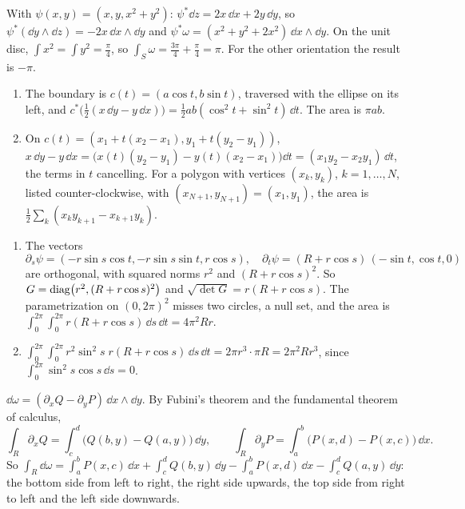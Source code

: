 With $\psi(x, y) = (x, y, x^2 + y^2)$: $\psi^*\dd z
= 2x\,\dd x + 2y\,\dd y$, so
$\psi^*(\dd y\wedge\dd z) = -2x\,\dd x\wedge\dd y$ and
$\psi^*\omega = (x^2 + y^2 + 2x^2)\,\dd x\wedge\dd y$. On the unit
disc, $\int x^2 = \int y^2 = \frac\pi4$, so
$\int_S\omega = \frac{3\pi}4 + \frac\pi4 = \pi$. For the other
orientation the result is $-\pi$.

\begin{enumerate}[nosep]
  \item The boundary is $c(t) = (a\cos t, b\sin t)$, traversed with the
        ellipse on its left, and
        $c^*\bigl(\frac12(x\,\dd y - y\,\dd x)\bigr)
        = \frac12ab(\cos^2t + \sin^2t)\,\dd t$. The area is $\pi ab$.
  \item On $c(t) = (x_1 + t(x_2 - x_1), y_1 + t(y_2 - y_1))$,
        $x\,\dd y - y\,\dd x
        = \bigl(x(t)(y_2 - y_1) - y(t)(x_2 - x_1)\bigr)\dd t
        = (x_1y_2 - x_2y_1)\,\dd t$, the terms in $t$ cancelling. For a
        polygon with vertices $(x_k, y_k)$, $k = 1,\dots,N$, listed
        counter-clockwise, with $(x_{N+1}, y_{N+1}) = (x_1, y_1)$, the
        area is $\frac12\sum_k(x_ky_{k+1} - x_{k+1}y_k)$.
\end{enumerate}

\begin{enumerate}[nosep]
  \item The vectors
        \[
          \partial_s\psi = (-r\sin s\cos t, -r\sin s\sin t, r\cos s) ,
          \quad
          \partial_t\psi = (R + r\cos s)\,(-\sin t, \cos t, 0)
        \]
        are orthogonal, with squared norms $r^2$ and
        $(R + r\cos s)^2$. So
        $G = \operatorname{diag}\bigl(r^2, (R + r\cos s)^2\bigr)$ and
        $\sqrt{\det G} = r(R + r\cos s)$. The parametrization on
        $(0, 2\pi)^2$ misses two circles, a null set, and the area is
        $\int_0^{2\pi}\!\int_0^{2\pi}r(R + r\cos s)\,\dd s\,\dd t
        = 4\pi^2Rr$.
  \item $\int_0^{2\pi}\!\int_0^{2\pi}r^2\sin^2s\;r(R + r\cos s)\,
        \dd s\,\dd t = 2\pi r^3\cdot\pi R = 2\pi^2Rr^3$, since
        $\int_0^{2\pi}\sin^2s\cos s\,\dd s = 0$.
\end{enumerate}

$\dd\omega = (\partial_xQ - \partial_yP)\,\dd x\wedge\dd y$. By
Fubini's theorem and the fundamental theorem of calculus,
\[
  \int_R\partial_xQ = \int_c^d\bigl(Q(b, y) - Q(a, y)\bigr)\,\dd y ,
  \qquad
  \int_R\partial_yP = \int_a^b\bigl(P(x, d) - P(x, c)\bigr)\,\dd x .
\]
So $\int_R\dd\omega = \int_a^bP(x, c)\,\dd x + \int_c^dQ(b, y)\,\dd y
- \int_a^bP(x, d)\,\dd x - \int_c^dQ(a, y)\,\dd y$: the bottom side
from left to right, the right side upwards, the top side from right to
left and the left side downwards.

